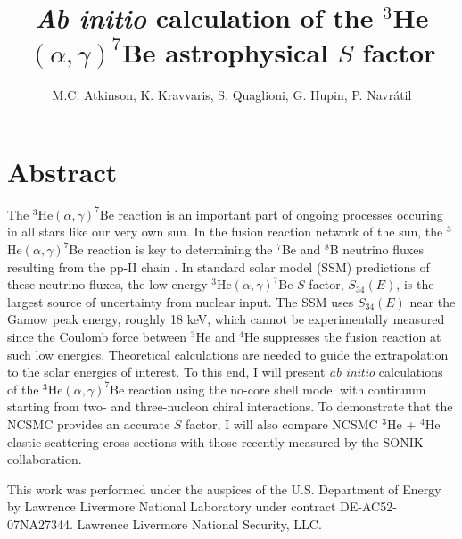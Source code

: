 \documentclass[a4paper]{article}
\title{\textit{Ab initio} calculation of the  $^3$He$(\alpha,\gamma)^7$Be astrophysical $S$ factor}
\author{M.C. Atkinson, K. Kravvaris, S. Quaglioni, G. Hupin, P. Navr\'{a}til}
\begin{document}
\maketitle

\section{Abstract}



The $^3$He$(\alpha,\gamma)^7$Be reaction is an important part of ongoing processes occuring in all stars like our very own sun. In the fusion reaction
network of the sun, the $^3$He$(\alpha,\gamma)^7$Be reaction is key to determining the $^7$Be and $^8$B neutrino fluxes resulting from the pp-II chain
. In standard solar model (SSM) predictions of these neutrino fluxes, the low-energy $^3$He$(\alpha,\gamma)^7$Be $S$ factor, $S_{34}(E)$, is the
largest source of uncertainty from nuclear input. The SSM uses $S_{34}(E)$ near the Gamow peak energy, roughly 18 keV, which cannot be
experimentally measured since the Coulomb force between $^3$He and $^4$He suppresses the fusion reaction at such low energies. Theoretical calculations are needed to guide the extrapolation to the solar energies of interest.  To this end, I will present \textit{ab initio} calculations of the $^3$He$(\alpha,\gamma)^7$Be reaction using the no-core shell model with continuum starting from two- and three-nucleon chiral interactions. To demonstrate that the NCSMC provides an accurate $S$ factor, I will also compare NCSMC $^{3}$He + $^{4}$He elastic-scattering cross sections with those recently measured by the SONIK collaboration. 



This work was performed under the auspices of the U.S. Department of Energy by Lawrence Livermore National Laboratory under contract DE-AC52-07NA27344. Lawrence Livermore National Security, LLC.
\end{document}
